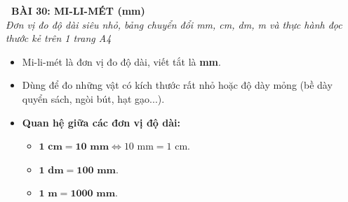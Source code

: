 \documentclass[11pt,a4paper]{article}
\begin{document}
\begin{tcolorbox}[
  enhanced,
  colback=white,
  colframe=primary,
  arc=3mm,
  boxrule=1.2pt,
  left=4mm, right=4mm, top=2.5mm, bottom=2.5mm,
  drop shadow=black!10!white
]
  \centering
  {\Large\bfseries\color{primary}\faBookmark\ BÀI 30: MI-LI-MÉT (mm)}\\[1.5mm]
  {\small\itshape\color{black!75}Đơn vị đo độ dài siêu nhỏ, bảng chuyển đổi mm, cm, dm, m và thực hành đọc thước kẻ trên 1 trang A4}
\end{tcolorbox}

\vspace{-2mm}


\noindent
\begin{minipage}[t]{0.49\textwidth}\vspace{0pt}
\begin{tcolorbox}[
  enhanced,
  colback=blue!4!white,
  colframe=blue!75!black,
  arc=2mm, boxrule=0.8pt,
  left=2mm, right=2mm, top=1.8mm, bottom=1.8mm,
  title={\footnotesize\bfseries\color{white}\faKey\ 1. Đơn vị Mi-li-mét (mm)}
]
{\footnotesize
\begin{itemize}\setlength{\itemsep}{1.5pt}\setlength{\leftskip}{-2.5mm}
  \item Mi-li-mét là đơn vị đo độ dài, viết tắt là \textbf{mm}.
  \item Dùng để đo những vật có kích thước rất nhỏ hoặc độ dày mỏng (bề dày quyển sách, ngòi bút, hạt gạo...).
  \item \textbf{Quan hệ giữa các đơn vị độ dài:}
  \begin{itemize}\setlength{\itemsep}{1pt}\setlength{\leftskip}{-2.5mm}
    \item $\mathbf{1\text{ cm} = 10\text{ mm}} \iff 10\text{ mm} = 1\text{ cm}$.
    \item $\mathbf{1\text{ dm} = 100\text{ mm}}$.
    \item $\mathbf{1\text{ m} = 1000\text{ mm}}$.
  \end{itemize}
\end{itemize}
}
\end{tcolorbox}
\end{minipage}
\hfill
\end{document}
